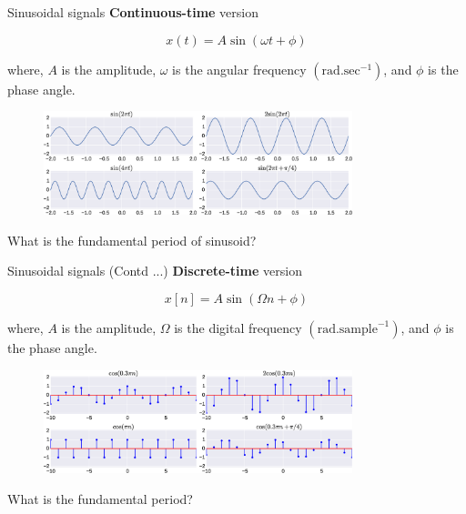 \documentclass[aspectratio=169]{beamer}
\begin{document}
\begin{frame}[t]
\end{frame}


\begin{frame}{Sinusoidal signals}
\textbf{Continuous-time} version

\[ x(t) = A \sin \left(\omega t + \phi\right) \]

where, $A$ is the amplitude, $\omega$ is the angular frequency $\left(\mathrm{rad}.\mathrm{sec}^{-1}\right)$, and $\phi$ is the phase angle.

\begin{figure}
\includegraphics[width=0.8\textwidth]{img/sinu.eps}
\end{figure}

What is the fundamental period of sinusoid?
\end{frame}



\begin{frame}[t]
\end{frame}



\begin{frame}[t]
\end{frame}



\begin{frame}[t]
\end{frame}



\begin{frame}{Sinusoidal signals (Contd ...)}
\textbf{Discrete-time} version

\[ x[n] = A \sin \left(\Omega n + \phi\right) \]

where, $A$ is the amplitude, $\Omega$ is the digital frequency $\left(\mathrm{rad}.\mathrm{sample}^{-1}\right)$, and $\phi$ is the phase angle.

\begin{figure}
\includegraphics[width=0.8\textwidth]{img/disc_sinu.eps}
\end{figure}

What is the fundamental period?
\end{frame}
\end{document}

